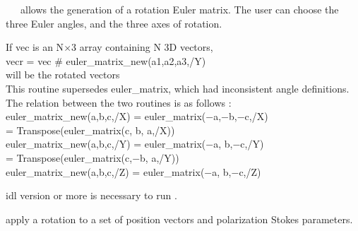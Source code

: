\begin{codedescription}
{\parbox[t]{\hsize}{\facname\ ~\ allows the generation of a rotation Euler matrix. The user
can choose the three Euler angles, and the three axes of rotation.

If vec is an N$\times$3 array containing N 3D vectors, \\
    vecr = vec  \# euler\_matrix\_new(a1,a2,a3,/Y) \\
will be the rotated vectors\\
 
This routine supersedes euler\_matrix, which had inconsistent angle
definitions. The relation between the two routines is as follows  :
\\[.2cm]
%
euler\_matrix\_new(a,b,c,/X)  =  euler\_matrix($-$a,$-$b,$-$c,/X) \\
= Transpose(euler\_matrix(c, b, a,/X)) \\[.2cm]
%
euler\_matrix\_new(a,b,c,/Y)  =  euler\_matrix($-$a, b,$-$c,/Y) \\
= Transpose(euler\_matrix(c,$-$b, a,/Y)) \\[.2cm]
%
euler\_matrix\_new(a,b,c,/Z)  =  euler\_matrix($-$a, b,$-$c,/Z)
}}
\end{codedescription}

\begin{related}
  \begin{sulist}{} %
    \item[idl] version \idlversion or more is necessary to run \thedocid.
    \item[\htmlref{rotate\_coord}{idl:rotate_coord}] apply a rotation to a set of position vectors and
    polarization Stokes parameters.
  \end{sulist}
\end{related}


